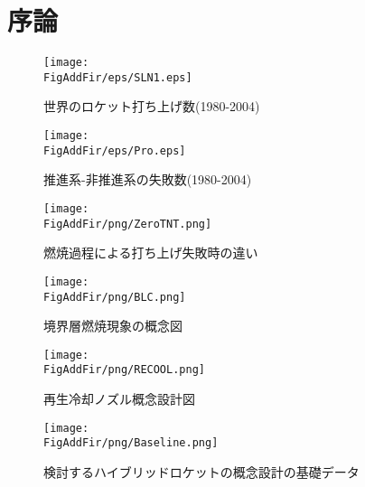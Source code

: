 \chapter{序論}
\newcommand{\FigAddFir}{./src/Chapter1/Figure}




\begin{figure}
\centering
\texttt{[image: \\FigAddFir/eps/SLN1.eps]}
\caption{世界のロケット打ち上げ数(1980-2004)}
\label{fig:Success/Failure}
\end{figure}
\begin{figure}
\centering
\texttt{[image: \\FigAddFir/eps/Pro.eps]}
\caption{推進系-非推進系の失敗数(1980-2004)}
\label{fig:ProFail}
\end{figure}
\begin{figure}
\centering
\texttt{[image: \\FigAddFir/png/ZeroTNT.png]}
\caption{燃焼過程による打ち上げ失敗時の違い}
\label{fig:DiffExplo}
\end{figure}
\begin{figure}
\centering
\texttt{[image: \\FigAddFir/png/BLC.png]}
\caption{境界層燃焼現象の概念図}
\label{fig:BLC}
\end{figure}
\begin{figure}
\centering
\texttt{[image: \\FigAddFir/png/RECOOL.png]}
\caption{再生冷却ノズル概念設計図}
\label{fig:ReCool}
\end{figure}
\begin{figure}
\centering
\texttt{[image: \\FigAddFir/png/Baseline.png]}
\caption{検討するハイブリッドロケットの概念設計の基礎データ}
\label{fig:Baseline}
\end{figure}
